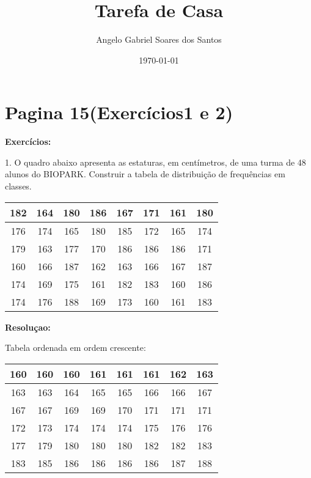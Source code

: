 \documentclass[12pt]{article}%
\title{Tarefa de Casa }
\author{Angelo Gabriel Soares dos Santos}
\date{\today}
\begin{document}
\maketitle
\section{Pagina 15(Exercícios1 e  2)}
\textbf{Exercícios:}

1. O quadro abaixo apresenta as estaturas, em centímetros, de uma turma de 48 alunos do BIOPARK. Construir a tabela de distribuição de frequências em classes.

\begin{center}
\begin{tabular}{|c|c|c|c|c|c|c|c|}
\hline
182 & 164 & 180 & 186 & 167 & 171 & 161 & 180 \\ \hline
176 & 174 & 165 & 180 & 185 & 172 & 165 & 174 \\ \hline
179 & 163 & 177 & 170 & 186 & 186 & 186 & 171 \\ \hline
160 & 166 & 187 & 162 & 163 & 166 & 167 & 187 \\ \hline
174 & 169 & 175 & 161 & 182 & 183 & 160 & 186 \\ \hline
174 & 176 & 188 & 169 & 173 & 160 & 161 & 183  \\ \hline
\end{tabular}
\end{center}
\color[rgb]{0.8,0.2,0.2}

\textbf{Resoluçao:}
\color[rgb]{0.2,0.2,0.2}

Tabela ordenada em ordem crescente:
\begin{center}
\begin{tabular}{|c|c|c|c|c|c|c|c|}
\hline
160 & 160 & 160 & 161 & 161 & 161 & 162 & 163 \\ \hline
163 & 163 & 164 & 165 & 165 & 166 & 166 & 167 \\ \hline
167 & 167 & 169 & 169 & 170 & 171 & 171 & 171 \\ \hline
172 & 173 & 174 & 174 & 174 & 175 & 176 & 176 \\ \hline
177 & 179 & 180 & 180 & 180 & 182 & 182 & 183 \\ \hline
183 & 185 & 186 & 186 & 186 & 186 & 187 & 188 \\ \hline
\end{tabular}
\end{center}
\end{document}

